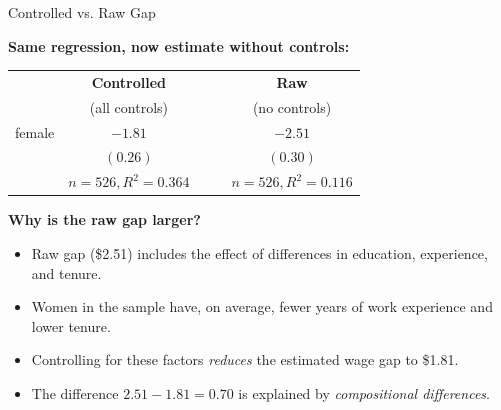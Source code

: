 \documentclass[aspectratio=169, 12pt]{beamer}
\begin{document}
\begin{frame}[shrink=25]{Controlled vs. Raw Gap}

  \textbf{Same regression, now estimate without controls:}

  \vspace{-0.3cm}

  \begin{center}
    \small
    \begin{tabular}{lcccc}
      \toprule
      & \textbf{Controlled} & & & \textbf{Raw} \\
      & (all controls) & & & (no controls) \\
      \midrule
      female & $-1.81$ & & & $-2.51$ \\
      & $(0.26)$ & & & $(0.30)$ \\
      \midrule
      & $n=526, R^2=0.364$ & & & $n=526, R^2=0.116$ \\
      \bottomrule
    \end{tabular}
  \end{center}

  \medskip

  \textbf{Why is the raw gap larger?}

  \begin{keybox}
    \begin{itemize}
      \item Raw gap (\$2.51) includes the effect of differences in education, experience, and tenure.
      \item Women in the sample have, on average, fewer years of work experience and lower tenure.
      \item Controlling for these factors \textit{reduces} the estimated wage gap to \$1.81.
      \item The difference $2.51 - 1.81 = 0.70$ is explained by \textit{compositional differences}.
    \end{itemize}
  \end{keybox}

\end{frame}
\end{document}
